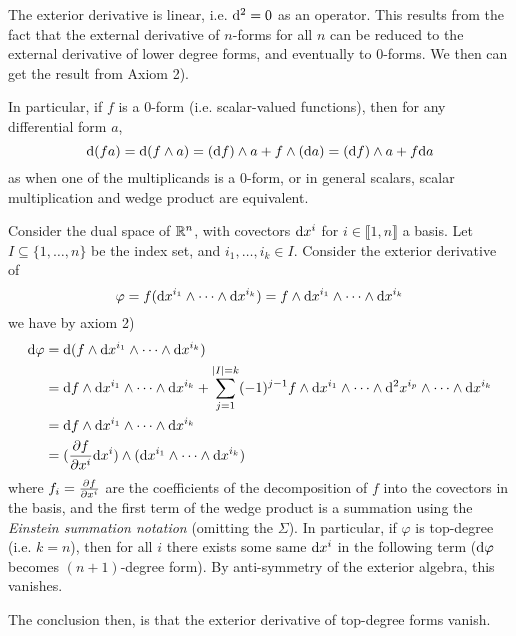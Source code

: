 \documentclass{article}
\begin{document}
\begin{remark}
    The exterior derivative is linear, i.e. $\mathrm{d}^2 = 0$ as an operator. This results from the fact that the external derivative of $n$-forms for all $n$ can be reduced to the external derivative of lower degree forms, and eventually to $0$-forms. We then can get the result from Axiom 2).
\end{remark}

\begin{remark}
    In particular, if $f$ is a $0$-form (i.e. scalar-valued functions), then for any differential form $a$,
    \[
     \mathrm{d}(fa) = \mathrm{d}(f \wedge a) = (\mathrm{d} f) \wedge a + f \wedge (\mathrm{d} a) = (\mathrm{d} f) \wedge a + f \mathrm{d} a
    \]
    as when one of the multiplicands is a $0$-form, or in general scalars, scalar multiplication and wedge product are equivalent. 
\end{remark}

\begin{example}
    Consider the dual space of $\mathbb{R}^n$, with covectors $\mathrm{d} x^i$ for $i \in \llbracket 1, n \rrbracket$ a basis. Let $I \subseteq \{1, \dots, n\}$ be the index set, and $i_1, \dots, i_k \in I$. Consider the exterior derivative of
    \[
        \varphi = f(\mathrm{d} x^{i_1} \wedge \dots \wedge \mathrm{d} x^{i_k}) =  f \wedge \mathrm{d} x^{i_1} \wedge \dots \wedge \mathrm{d} x^{i_k}
    \]
    we have by axiom 2)
    \begin{align*}
        \mathrm{d} \varphi
        & = \mathrm{d} (f \wedge \mathrm{d} x^{i_1} \wedge \dots \wedge \mathrm{d} x^{i_k}) \\
        & = \mathrm{d} f \wedge \mathrm{d} x^{i_1} \wedge \dots \wedge \mathrm{d} x^{i_k} + \sum_{j = 1}^{\left|I\right| = k} (-1)^{j - 1} f \wedge \mathrm{d} x^{i_1} \wedge \dots \wedge \mathrm{d}^2 x^{i_p} \wedge \dots \wedge \mathrm{d} x^{i_k} \\
        & = \mathrm{d} f \wedge \mathrm{d} x^{i_1} \wedge \dots \wedge \mathrm{d} x^{i_k} \\
        & = (\frac{\partial f}{\partial x^i} \mathrm{d} x^i) \wedge (\mathrm{d} x^{i_1} \wedge \dots \wedge \mathrm{d} x^{i_k})
    \end{align*}
    where $f_i = \frac{\partial f}{\partial x^i}$ are the coefficients of the decomposition of $f$ into the covectors in the basis, and the first term of the wedge product is a summation using the \emph{Einstein summation notation} (omitting the $\Sigma$). In particular, if $\varphi$ is top-degree (i.e. $k = n$), then for all $i$ there exists some same $\mathrm{d} x^i$ in the following term ($\mathrm{d} \varphi$ becomes $(n+1)$-degree form). By anti-symmetry of the exterior algebra, this vanishes.

    The conclusion then, is that the exterior derivative of top-degree forms vanish. 
\end{example}
\end{document}
